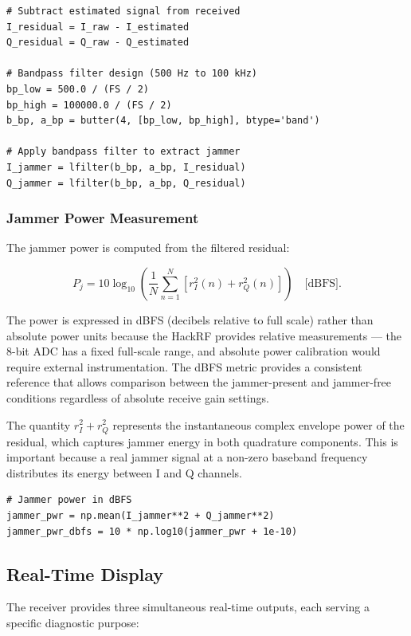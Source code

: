 \documentclass{article}
\begin{document}
\begin{verbatim}
# Subtract estimated signal from received
I_residual = I_raw - I_estimated
Q_residual = Q_raw - Q_estimated

# Bandpass filter design (500 Hz to 100 kHz)
bp_low = 500.0 / (FS / 2)
bp_high = 100000.0 / (FS / 2)
b_bp, a_bp = butter(4, [bp_low, bp_high], btype='band')

# Apply bandpass filter to extract jammer
I_jammer = lfilter(b_bp, a_bp, I_residual)
Q_jammer = lfilter(b_bp, a_bp, Q_residual)
\end{verbatim}

\subsubsection{Jammer Power Measurement}

The jammer power is computed from the filtered residual:

\begin{equation}
P_j = 10 \log_{10}\left( \frac{1}{N} \sum_{n=1}^{N} \left[ r_I^2(n) + r_Q^2(n) \right] \right) \quad \text{[dBFS]}.
\end{equation}

The power is expressed in dBFS (decibels relative to full scale) rather than absolute power units because the HackRF provides relative measurements — the 8-bit ADC has a fixed full-scale range, and absolute power calibration would require external instrumentation. The dBFS metric provides a consistent reference that allows comparison between the jammer-present and jammer-free conditions regardless of absolute receive gain settings.

The quantity $r_I^2 + r_Q^2$ represents the instantaneous complex envelope power of the residual, which captures jammer energy in both quadrature components. This is important because a real jammer signal at a non-zero baseband frequency distributes its energy between I and Q channels.

\begin{verbatim}
# Jammer power in dBFS
jammer_pwr = np.mean(I_jammer**2 + Q_jammer**2)
jammer_pwr_dbfs = 10 * np.log10(jammer_pwr + 1e-10)
\end{verbatim}

\subsection{Real-Time Display}

The receiver provides three simultaneous real-time outputs, each serving a specific diagnostic purpose:
\end{document}
